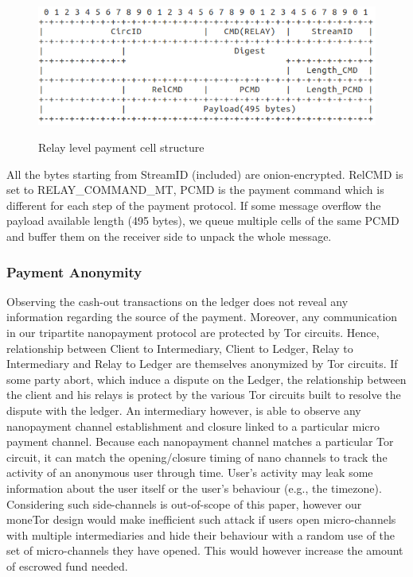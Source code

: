 \begin{figure}[h]
	\centering
	\includegraphics[scale=0.38]{images/payment_cell_header.png}
	\label{fig:relay_command_mt_structure}
	\caption{Relay level payment cell structure}
\end{figure}

All the bytes starting from StreamID (included) are onion-encrypted. RelCMD is set to RELAY\_COMMAND\_MT, PCMD is the payment command which is different for each step of the payment protocol. If some message overflow the payload available length (495 bytes), we queue multiple cells of the same PCMD and buffer them on the receiver side to unpack the whole message.

\subsubsection{Payment Anonymity}

Observing the cash-out transactions on the ledger does not reveal any information regarding the source of the payment. Moreover, any communication in our tripartite nanopayment protocol are protected by Tor circuits. Hence, relationship between Client to Intermediary, Client to Ledger, Relay to Intermediary and Relay to Ledger are themselves anonymized by Tor circuits. If some party abort, which induce a dispute on the Ledger, the relationship between the client and his relays is protect by the various Tor circuits built to resolve the dispute with the ledger.
An intermediary however, is able to observe any nanopayment channel establishment and closure linked to a particular micro payment channel. Because each nanopayment channel matches a particular Tor circuit, it can match the opening/closure timing of nano channels to track the activity of an anonymous user through time. User's activity may leak some information about the user itself or the user's behaviour (e.g., the timezone). Considering such side-channels is out-of-scope of this paper, however our moneTor design would make inefficient such attack if users open micro-channels with multiple intermediaries and hide their behaviour with a random use of the set of micro-channels they have opened. This would however increase the amount of escrowed fund needed.

